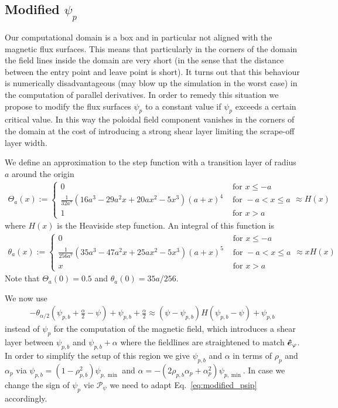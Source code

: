 \subsection{ Modified $\psi_p$}
Our computational domain is a box and in particular not aligned with the
magnetic flux surfaces. This means that particularly in the corners of
the domain the field lines inside the domain are very short (in the
sense that the distance between the entry point and leave point is short).
It turns out that this behaviour is numerically disadvantageous (may
blow up the simulation in the worst case) in the
computation of parallel derivatives. In order to remedy this situation
we propose to modify the flux surfaces $\psi_p$ to a constant value
if $\psi_p$ exceeds a certain critical value. In this way the poloidal
field component vanishes in the corners of the domain at the cost
of introducing a strong shear layer limiting the scrape-off layer width.

We define an approximation to the step function with a transition layer of radius $a$
around the origin
\begin{align}
\Theta_a(x) := \begin{cases}
    0 & \text{ for } x \leq -a  \\
    \frac{1}{32 a^7}  \left(16 a^3-29 a^2 x+20 a x^2-5 x^3\right) (a+x)^4
    &\text{ for } -a<x\leq a \\
    1 & \text{ for } x > a
\end{cases}
    \approx H(x)
\label{eq:approx_heaviside}
\end{align}
where $H(x)$ is the Heaviside step function.
An integral of this function is
\begin{align}
\theta_a(x) := \begin{cases}
    0 &\text{ for } x \leq -a \\
    \frac{1}{256 a^7} \left(35 a^3-47 a^2 x+25 a x^2-5 x^3\right) (a+x)^5
     &\text{ for } -a<x\leq a \\
x &\text{ for } x > a
\end{cases}
    \approx x H(x)
\end{align}
Note that $\Theta_a(0) = 0.5$ and $\theta_a(0) = 35a/256$.

We now use
\begin{align}
    -\theta_{\alpha/2}\left(\psi_{p,b} + \frac{\alpha}{2} - \psi \right)+\psi_{p,b}+\frac{\alpha}{2} \approx (\psi- \psi_{p,b})H(\psi_{p,b}-\psi) + \psi_{p,b}
\label{eq:modified_psip}
\end{align}
instead of $\psi_p$ for the computation of the
magnetic field, which introduces a shear layer between $\psi_{p,b}$ and $\psi_{p,b}+\alpha$ where the
fieldlines are straightened to match $\bm{\hat{e}}_\varphi$.
In order to simplify the setup of this region we give $\psi_{p,b}$ and $\alpha$ in terms of
$\rho_p$ and $\alpha_p$ via $\psi_{p,b} = (1-\rho_{p,b}^2)\psi_{p,\min}$ and $\alpha = -(2\rho_{p,b} \alpha_p + \alpha_p^2)\psi_{p,\min}$. In case we change the sign
of $\psi_p$ vie $\mathcal P_\psi$ we need to adapt Eq.~\eqref{eq:modified_psip}
accordingly.


